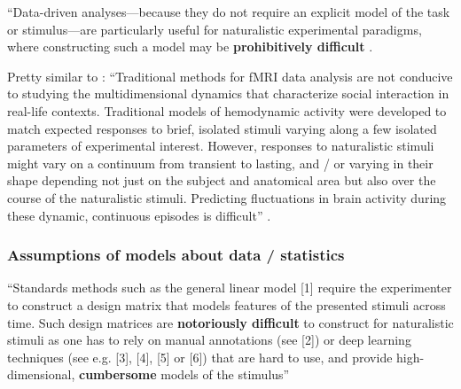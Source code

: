 ``Data-driven analyses---because they do not require an explicit model of the
task or stimulus---are particularly useful for naturalistic experimental
paradigms, where constructing such a model may be \textbf{prohibitively
difficult} \citep{nastase2019measuring}.

%
Pretty similar to \citet{nastase2019measuring}: ``Traditional methods for fMRI
data analysis are not conducive to studying the multidimensional dynamics that
characterize social interaction in real-life contexts.
%
Traditional models of hemodynamic activity were developed to match expected
responses to brief, isolated stimuli varying along a few isolated parameters of
experimental interest.
%
However, responses to naturalistic stimuli might vary on a continuum from
transient to lasting, and / or varying in their shape depending not just on the
subject and anatomical area but also over the course of the naturalistic
stimuli.
%
Predicting fluctuations in brain activity during these dynamic, continuous
episodes is difficult'' \citep{nastase2019measuring}.


\subsubsection{Assumptions of models about data / statistics}

%
``Standards methods such as the general linear model [1] require the
experimenter to construct a design matrix that models features of the presented
stimuli across time.
%
Such design matrices are \textbf{notoriously difficult} to construct for
naturalistic stimuli as one has to rely on manual annotations (see [2]) or deep
learning techniques (see e.g. [3], [4], [5] or [6]) that are hard to use, and
provide high-dimensional, \textbf{cumbersome} models of the stimulus''
\citep{richard2019fast}

